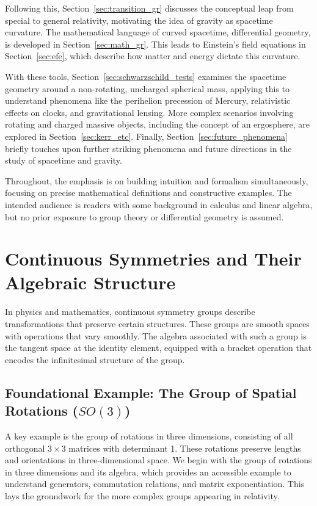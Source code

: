 \documentclass{amsart}
\theoremstyle{definition}
\theoremstyle{remark}
\begin{document}
Following this, Section~\ref{sec:transition_gr} discusses the conceptual leap from special to general relativity, motivating the idea of gravity as spacetime curvature.
The mathematical language of curved spacetime, differential geometry, is developed in Section~\ref{sec:math_gr}.
This leads to Einstein's field equations in Section~\ref{sec:efe}, which describe how matter and energy dictate this curvature.

With these tools, Section~\ref{sec:schwarzschild_tests} examines the spacetime geometry around a non-rotating, uncharged spherical mass, applying this to understand phenomena like the perihelion precession of Mercury, relativistic effects on clocks, and gravitational lensing.
More complex scenarios involving rotating and charged massive objects, including the concept of an ergosphere, are explored in Section~\ref{sec:kerr_etc}.
Finally, Section~\ref{sec:future_phenomena} briefly touches upon further striking phenomena and future directions in the study of spacetime and gravity.

Throughout, the emphasis is on building intuition and formalism simultaneously, focusing on precise mathematical definitions and constructive examples.
The intended audience is readers with some background in calculus and linear algebra, but no prior exposure to group theory or differential geometry is assumed.

\section{Continuous Symmetries and Their Algebraic Structure}
\label{sec:cont_symm}

In physics and mathematics, continuous symmetry groups describe transformations that preserve certain structures.
These groups are smooth spaces with operations that vary smoothly.
The algebra associated with such a group is the tangent space at the identity element, equipped with a bracket operation that encodes the infinitesimal structure of the group.

\subsection{Foundational Example: The Group of Spatial Rotations ($SO(3)$)}
\label{subsec:so3}
A key example is the group of rotations in three dimensions, consisting of all orthogonal $3 \times 3$ matrices with determinant 1.
These rotations preserve lengths and orientations in three-dimensional space.
We begin with the group of rotations in three dimensions and its algebra, which provides an accessible example to understand generators, commutation relations, and matrix exponentiation.
This lays the groundwork for the more complex groups appearing in relativity.
\end{document}
